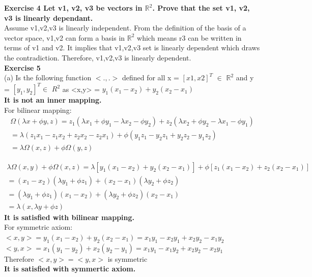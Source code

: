 \documentclass{article}
\begin{document}
\textbf{Exercise 4 Let v1, v2, v3 be vectors in $\mathbb{R}^{2}$. Prove that the set {v1, v2, v3} is linearly dependant.}\\
Assume v1,v2,v3 is linearly independent. From the definition of the basis of a vector space, v1,v2 can form a basis in $\mathbb{R}^{2}$ which means r3 can be written in terms of v1 and v2. It implies that v1,v2,v3 set is linearly dependent which draws the contradiction. Therefore, v1,v2,v3 is linearly dependent.\\

\textbf{Exercise 5}\\
(a) Is the following function $<.,.>$ defined for all x = $[x1, x2]^T$ $\in$  $\mathbb{R}^{2}$ and y = $[y_1,y_2]^T \in$ $R^{2}$ as <x,y> = $y_1(x_1 - x_2) + y_2(x_2 - x_1)$ \\
\textbf {It is not an inner mapping.} \\
For bilinear mapping: \\
\begin{gather}
\Omega(\lambda x + \phi y, z) =  z_1 (\lambda x_1 + \phi y_1 -\lambda x_2 - \phi y_2) + z_2(\lambda x_2 + \phi y_2 - \lambda x_1 - \phi y_1)\\
= \lambda (z_1x_1 - z_1x_2 + z_2x_2 - z_2x_1) + \phi(y_1z_1 - y_2z_1 + y_2z_2 - y_1z_2)\\
= \lambda\Omega(x,z) + \phi\Omega(y,z)
\end{gather}

\begin{gather}
\lambda \Omega (x,y) + \phi \Omega (x,z)=\lambda [y_1(x_1 - x_2) + y_2 (x_2 - x_1)] + \phi[z_1(x_1-x_2) + z_2(x_2-x_1)] \\
= (x_1 - x_2)(\lambda y_1 + \phi z_1) + (x_2 - x_1) (\lambda y_2 + \phi z_2)\\
= (\lambda y_1 + \phi z_1)(x_1 - x_2) + (\lambda y_2 + \phi z_2)(x_2 - x_1)\\
= \lambda(x,\lambda y + \phi z) 
\end{gather}
\textbf{It is satisfied with bilinear mapping.} \\

For symmetric axiom:\\
$<x,y> = y_1(x_1 - x_2) + y_2(x_2 - x_1) = x_1y_1 - x_2y_1 + x_2y_2 - x_1y_2$ \\
$<y,x> = x_1(y_1 - y_2) + x_2(y_2 - y_1) = x_1y_1 - x_1y_2 + x_2y_2 - x_2y_1$\\
Therefore $<x,y> = <y,x>$ is symmetric \\

\textbf{It is satisfied with symmertic axiom.}\\ 
\end{document}
